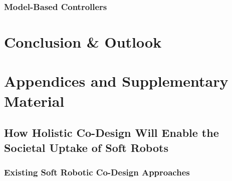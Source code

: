 \documentclass{dissertation}
\begin{document}
\section{Model-Based Controllers}




% 
% 
% 
% 
% 

% 
% 
% 
% 



\part{Conclusion \& Outlook}


\part{Appendices and Supplementary Material}
\appendix



\chapter{How Holistic Co-Design Will Enable the Societal Uptake of Soft Robots}\label{chp:towardscodesign}
\section{Existing Soft Robotic Co-Design Approaches}
\end{document}
